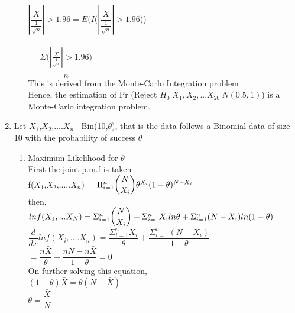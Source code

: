 \documentclass[11pt]{article}
\begin{document}
\begin{enumerate}
\begin{enumerate}
$|{\dfrac{\bar {X}}{\frac{1}{\sqrt{n}}}}| > 1.96  = E(I(|{\dfrac{\bar {X}}{\frac{1}{\sqrt{n}}}}| > 1.96 $))\\\\

$ = \dfrac{\Sigma{(|{\frac{\bar {X}}{\frac{1}{\sqrt{n}}}}| > 1.96})} {n}$\\

This is derived from the Monte-Carlo Integration problem\\

Hence, the estimation of Pr (Reject $H_{0}|X_{1},X_{2},...X_{20}~ N(0.5,1)$) is a Monte-Carlo integration problem.\\
\end{enumerate}


\item Let ${X_1}$,${X_2}$,....${X_n}$ $~$ Bin(10,$\theta$), that is the data follows a Binomial data of size 10 with the probability of success $\theta$ \\

\begin{enumerate}

\item Maximum Likelihood for $\theta$ \\

First the joint p.m.f is taken \\

f(${X_1}$,${X_2}$,.....${X_n}$) = $\Pi_{i=1}^{n} \dbinom{N}{X_i} \theta^{X_i} {(1-\theta)^{N-{X_i}}} $ \\

then,\\

$ln f ({X_1},...{X_N} ) ={\Sigma_{i=1}^{n}} \dbinom{N}{X_i} + {\Sigma_{i=1}^{n}} {X_i} ln \theta + {\Sigma_{i=1}^{n}} (N- {X_i})ln (1-\theta) $\\

$\dfrac{d}{dx} ln f ({X_i},....{X_n}) = \dfrac{{\Sigma_{i=1}^{n}}{X_i}}{\theta} +\dfrac{\Sigma_{i=1}^{n}(N-{X_i})}{1-\theta}$ \\

$ = \dfrac{n \bar{X}}{\theta} - \dfrac{nN-n\bar{X}}{1-\theta} = 0 $ \\

On further solving this equation,\\

$ (1-\theta) \bar{X} = \theta(N- \bar{X})  $\\

$\theta = \dfrac{\bar{X}}{N}$ \\


\end{enumerate}
\end{enumerate}
\end{document}
